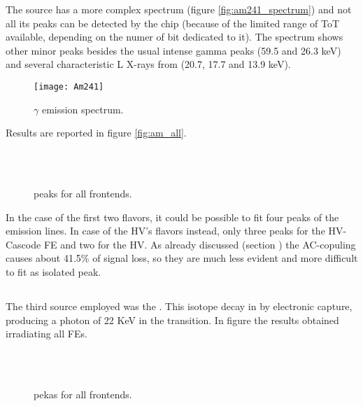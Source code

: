 The  source has a more complex spectrum (figure \vref{fig:am241_spectrum}) and not all its peaks can be detected by the chip (because of the limited range of ToT available, depending on the numer of bit dedicated to it). The spectrum shows other minor peaks besides the usual intense gamma peaks (59.5 and 26.3 keV) and several characteristic L X-rays from  (20.7, 17.7 and 13.9 keV).\\ 

\begin{figure}[h!]
\centering
\texttt{[image: Am241]}
\caption{ $\gamma$ emission spectrum.}
\label{fig:am241_spectrum}
\end{figure}

Results are reported in figure \vref{fig:am_all}. 

\begin{figure}[h!]
\centering
{}\quad
{}\\
\quad
{}\\
\caption{ peaks for all frontends.}
\label{fig:am_all}
\end{figure}

In the case of the first two flavors, it could be possible to fit four peaks of the emission lines. In case of the HV's flavors instead, only three peaks for the HV-Cascode FE and two for the HV. As already discussed (section ) the AC-copuling causes about 41.5\% of signal loss, so they are much less evident and more difficult to fit as isolated peak.


\subsection{}

The third source employed was the . This isotope decay in  by electronic capture, producing a photon of 22 KeV in the transition. In figure  the results obtained irradiating all FEs. 

\begin{figure}[h!]
\centering
{}\quad
{}\\
\quad
{}\\
\caption{ pekas for all frontends.}
\label{fig:cd_all}
\end{figure}

